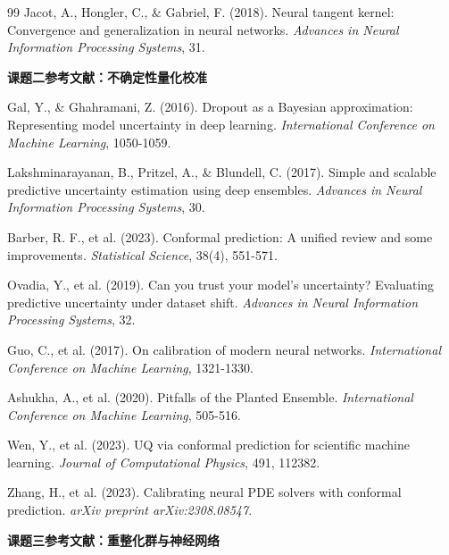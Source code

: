 \documentclass[12pt,a4paper,twoside]{article}
\begin{document}
\begin{inversation}
\begin{thebibliography}{99}
\vspace{0.2cm}
\noindent[14] Jacot, A., Hongler, C., \& Gabriel, F. (2018). Neural tangent kernel: Convergence and generalization in neural networks. \textit{Advances in Neural Information Processing Systems}, 31.

\vspace{0.5cm}
\noindent\textbf{课题二参考文献：不确定性量化校准}

\vspace{0.2cm}
\noindent[15] Gal, Y., \& Ghahramani, Z. (2016). Dropout as a Bayesian approximation: Representing model uncertainty in deep learning. \textit{International Conference on Machine Learning}, 1050-1059.

\vspace{0.2cm}
\noindent[16] Lakshminarayanan, B., Pritzel, A., \& Blundell, C. (2017). Simple and scalable predictive uncertainty estimation using deep ensembles. \textit{Advances in Neural Information Processing Systems}, 30.

\vspace{0.2cm}
\noindent[17] Barber, R. F., et al. (2023). Conformal prediction: A unified review and some improvements. \textit{Statistical Science}, 38(4), 551-571.

\vspace{0.2cm}
\noindent[18] Ovadia, Y., et al. (2019). Can you trust your model's uncertainty? Evaluating predictive uncertainty under dataset shift. \textit{Advances in Neural Information Processing Systems}, 32.

\vspace{0.2cm}
\noindent[19] Guo, C., et al. (2017). On calibration of modern neural networks. \textit{International Conference on Machine Learning}, 1321-1330.

\vspace{0.2cm}
\noindent[20] Ashukha, A., et al. (2020). Pitfalls of the Planted Ensemble. \textit{International Conference on Machine Learning}, 505-516.

\vspace{0.2cm}
\noindent[21] Wen, Y., et al. (2023). UQ via conformal prediction for scientific machine learning. \textit{Journal of Computational Physics}, 491, 112382.

\vspace{0.2cm}
\noindent[22] Zhang, H., et al. (2023). Calibrating neural PDE solvers with conformal prediction. \textit{arXiv preprint arXiv:2308.08547}.

\vspace{0.5cm}
\noindent\textbf{课题三参考文献：重整化群与神经网络}


\end{thebibliography}
\end{inversation}
\end{document}
